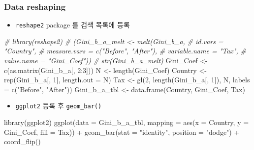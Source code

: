 \documentclass[
]{article}
\newenvironment{Shaded}{\begin{snugshade}}{\end{snugshade}}
\newcommand{\AttributeTok}[1]{\textcolor[rgb]{0.77,0.63,0.00}{#1}}
\newcommand{\CommentTok}[1]{\textcolor[rgb]{0.56,0.35,0.01}{\textit{#1}}}
\newcommand{\DecValTok}[1]{\textcolor[rgb]{0.00,0.00,0.81}{#1}}
\newcommand{\FunctionTok}[1]{\textcolor[rgb]{0.00,0.00,0.00}{#1}}
\newcommand{\NormalTok}[1]{#1}
\newcommand{\OtherTok}[1]{\textcolor[rgb]{0.56,0.35,0.01}{#1}}
\newcommand{\SpecialCharTok}[1]{\textcolor[rgb]{0.00,0.00,0.00}{#1}}
\newcommand{\StringTok}[1]{\textcolor[rgb]{0.31,0.60,0.02}{#1}}
\providecommand{\tightlist}{%
  \setlength{\itemsep}{0pt}\setlength{\parskip}{0pt}}
\begin{document}
\hypertarget{data-reshaping}{%
\subsubsection{Data reshaping}\label{data-reshaping}}

\begin{itemize}
\tightlist
\item
  \texttt{reshape2} package 를 검색 목록에 등록
\end{itemize}

\begin{Shaded}
\begin{Highlighting}[]
\CommentTok{\# library(reshape2)}
\CommentTok{\# (Gini\_b\_a\_melt \textless{}{-} melt(Gini\_b\_a, }
\CommentTok{\#                        id.vars = "Country", }
\CommentTok{\#                        measure.vars = c("Before", "After"), }
\CommentTok{\#                        variable.name = "Tax", }
\CommentTok{\#                        value.name = "Gini\_Coef"))}
\CommentTok{\# str(Gini\_b\_a\_melt)}
\NormalTok{Gini\_Coef }\OtherTok{\textless{}{-}} \FunctionTok{c}\NormalTok{(}\FunctionTok{as.matrix}\NormalTok{(Gini\_b\_a[, }\DecValTok{2}\SpecialCharTok{:}\DecValTok{3}\NormalTok{]))}
\NormalTok{N }\OtherTok{\textless{}{-}} \FunctionTok{length}\NormalTok{(Gini\_Coef)}
\NormalTok{Country }\OtherTok{\textless{}{-}} \FunctionTok{rep}\NormalTok{(Gini\_b\_a[, }\DecValTok{1}\NormalTok{], }\AttributeTok{length.out =}\NormalTok{ N)}
\NormalTok{Tax }\OtherTok{\textless{}{-}} \FunctionTok{gl}\NormalTok{(}\DecValTok{2}\NormalTok{, }\FunctionTok{length}\NormalTok{(Gini\_b\_a[, }\DecValTok{1}\NormalTok{]), N, }
          \AttributeTok{labels =} \FunctionTok{c}\NormalTok{(}\StringTok{"Before"}\NormalTok{, }\StringTok{"After"}\NormalTok{)) }
\NormalTok{Gini\_b\_a\_tbl }\OtherTok{\textless{}{-}} \FunctionTok{data.frame}\NormalTok{(Country, Gini\_Coef, Tax)}
\end{Highlighting}
\end{Shaded}

\begin{itemize}
\tightlist
\item
  \texttt{ggplot2} 등록 후 \texttt{geom\_bar()}
\end{itemize}

\begin{Shaded}
\begin{Highlighting}[]
\FunctionTok{library}\NormalTok{(ggplot2)}
\FunctionTok{ggplot}\NormalTok{(}\AttributeTok{data =}\NormalTok{ Gini\_b\_a\_tbl, }
       \AttributeTok{mapping =} \FunctionTok{aes}\NormalTok{(}\AttributeTok{x =}\NormalTok{ Country, }
                     \AttributeTok{y =}\NormalTok{ Gini\_Coef, }
                     \AttributeTok{fill =}\NormalTok{ Tax)) }\SpecialCharTok{+} 
  \FunctionTok{geom\_bar}\NormalTok{(}\AttributeTok{stat =} \StringTok{"identity"}\NormalTok{, }
           \AttributeTok{position =} \StringTok{"dodge"}\NormalTok{) }\SpecialCharTok{+}
  \FunctionTok{coord\_flip}\NormalTok{()}
\end{Highlighting}
\end{Shaded}
\end{document}
